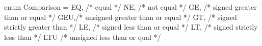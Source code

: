 enum Comparison = { 
  EQ, /* equal */
  NE, /* not equal */
  GE, /* signed greater than or equal */
  GEU,/* unsigned greater than or equal */ 
  GT, /* signed strictly greater than */ 
  LE, /* signed less than or equal */ 
  LT, /* signed strictly less than */ 
  LTU /* unsigned less than or qual */ 
}

